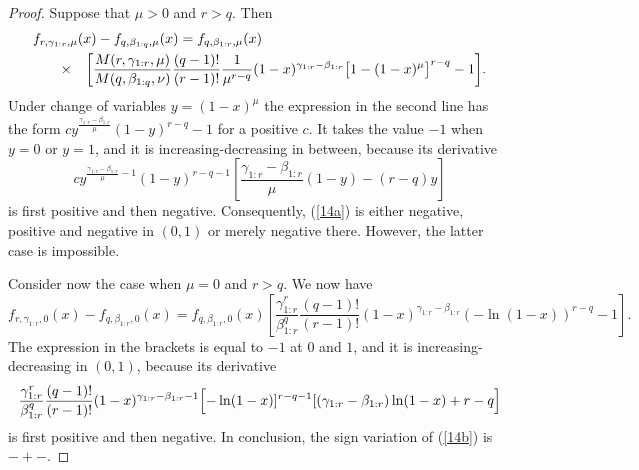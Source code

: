 \documentclass [11pt]{article}
\begin{document}
\begin{proof}
Suppose that $\mu>0$ and $r>q$. Then
\begin{eqnarray}
\label{14a}
\lefteqn{f_{r, \gamma_{1:r}, \mu} (x) - f_{q, \beta_{1:q}, \mu} (x)
=  f_{q, \beta_{1:r}, \mu} (x)} \nonumber \\
& \qquad\times & \left[
\frac{M(r,\gamma_{1:r},\mu)}{M(q,\beta_{1:q},\nu)}
\frac{(q-1)!}{(r-1)!}\frac{1}{\mu^{r-q}}
(1-x)^{\gamma_{1:r}-\beta_{1:r}} \bigl[1- (1-x)^\mu\bigr]^{r-q}-1\right]\!.
\end{eqnarray}
Under change of variables $y= (1-x)^\mu$ the expression in the second line has the form\linebreak 
$c y^{\frac{\gamma_{1:r}-\beta_{1:r}}{\mu}}(1-y)^{r-q}-1$ for a positive $c$. It takes the value $-1$ when $y=0$ or $y=1$, and it is increasing-decreasing in between, because its derivative
\[
c y^{\frac{\gamma_{1:r}-\beta_{1:r}}{\mu}-1}
(1-y)^{r-q-1}\left[ \frac{\gamma_{1:r}-\beta_{1:r}}{\mu} (1-y) -
(r-q)y \right]
\]
is first positive and then negative.
Consequently, (\ref{14a}) is either negative, positive and negative in $(0,1)$ or merely negative there. However, the latter case is impossible.

\smallskip

Consider now the case when $\mu=0$ and $r>q$. We now have
\begin{equation}
\label{14b}
f_{r, \gamma_{1:r}, 0} (x) - f_{q, \beta_{1:r}, 0} (x)
  =  f_{q, \beta_{1:r}, 0} (x)   \left[ \frac{\gamma_{1:r}^r}{\beta_{1:r}^q}
\frac{(q\!-\!1)!}{(r\!-\!1)!} (1-x)^{\gamma_{1:r}-\beta_{1:r}}
(-\ln (1-x))^{r-q}-1 \right].
\end{equation}
The expression in the brackets is equal to $-1$ at $0$ and $1$, and it is increasing-decreasing in $(0,1)$, because its
derivative
\[
\frac{\gamma_{1:r}^r}{\beta_{1:r}^q}
\frac{(q-1)!}{(r-1)!} (1-x)^{\gamma_{1:r}-\beta_{1:r}-1}
\Bigl[-\ln (1-x)]^{r-q-1}[(\gamma_{1:r}-\beta_{1:r})\ln (1-x) +r-q\Bigr]
\]
is first positive and then negative.  In conclusion, the sign variation of (\ref{14b}) is $-+-$.

\smallskip


\end{proof}
\end{document}
